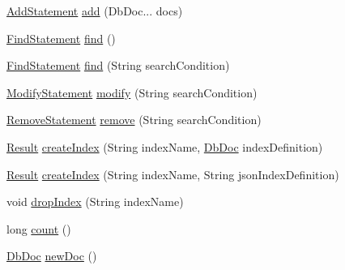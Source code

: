 \begin{DoxyCompactItemize}
\item 
\mbox{\hyperlink{interfacecom_1_1mysql_1_1cj_1_1xdevapi_1_1_add_statement}{Add\+Statement}} \mbox{\hyperlink{classcom_1_1mysql_1_1cj_1_1xdevapi_1_1_collection_impl_afd41989f45416765f570c5b8d207055b}{add}} (Db\+Doc... docs)
\item 
\mbox{\hyperlink{interfacecom_1_1mysql_1_1cj_1_1xdevapi_1_1_find_statement}{Find\+Statement}} \mbox{\hyperlink{classcom_1_1mysql_1_1cj_1_1xdevapi_1_1_collection_impl_af169d40d8cffa2ec78bcf6f81af73291}{find}} ()
\item 
\mbox{\hyperlink{interfacecom_1_1mysql_1_1cj_1_1xdevapi_1_1_find_statement}{Find\+Statement}} \mbox{\hyperlink{classcom_1_1mysql_1_1cj_1_1xdevapi_1_1_collection_impl_a91850d5f224ad4c17dc099d48ebd04fd}{find}} (String search\+Condition)
\item 
\mbox{\hyperlink{interfacecom_1_1mysql_1_1cj_1_1xdevapi_1_1_modify_statement}{Modify\+Statement}} \mbox{\hyperlink{classcom_1_1mysql_1_1cj_1_1xdevapi_1_1_collection_impl_a179e72d8996f65f97f833b6d47f01955}{modify}} (String search\+Condition)
\item 
\mbox{\hyperlink{interfacecom_1_1mysql_1_1cj_1_1xdevapi_1_1_remove_statement}{Remove\+Statement}} \mbox{\hyperlink{classcom_1_1mysql_1_1cj_1_1xdevapi_1_1_collection_impl_a24da6165b36b28a59ce0ea58249c9c96}{remove}} (String search\+Condition)
\item 
\mbox{\hyperlink{interfacecom_1_1mysql_1_1cj_1_1xdevapi_1_1_result}{Result}} \mbox{\hyperlink{classcom_1_1mysql_1_1cj_1_1xdevapi_1_1_collection_impl_ab56617c315aeee63c89d1b0d6a498b8c}{create\+Index}} (String index\+Name, \mbox{\hyperlink{interfacecom_1_1mysql_1_1cj_1_1xdevapi_1_1_db_doc}{Db\+Doc}} index\+Definition)
\item 
\mbox{\hyperlink{interfacecom_1_1mysql_1_1cj_1_1xdevapi_1_1_result}{Result}} \mbox{\hyperlink{classcom_1_1mysql_1_1cj_1_1xdevapi_1_1_collection_impl_a761bb8251d0e562254422fb8a23a2d81}{create\+Index}} (String index\+Name, String json\+Index\+Definition)
\item 
void \mbox{\hyperlink{classcom_1_1mysql_1_1cj_1_1xdevapi_1_1_collection_impl_a9298edfce745eda04a4cd0284c6fd7dd}{drop\+Index}} (String index\+Name)
\item 
long \mbox{\hyperlink{classcom_1_1mysql_1_1cj_1_1xdevapi_1_1_collection_impl_ac5d114d9962c30fe704586addce32f07}{count}} ()
\item 
\mbox{\hyperlink{interfacecom_1_1mysql_1_1cj_1_1xdevapi_1_1_db_doc}{Db\+Doc}} \mbox{\hyperlink{classcom_1_1mysql_1_1cj_1_1xdevapi_1_1_collection_impl_a65ff32eeb5c30b2e604582c22c8f5bbd}{new\+Doc}} ()

\end{DoxyCompactItemize}
